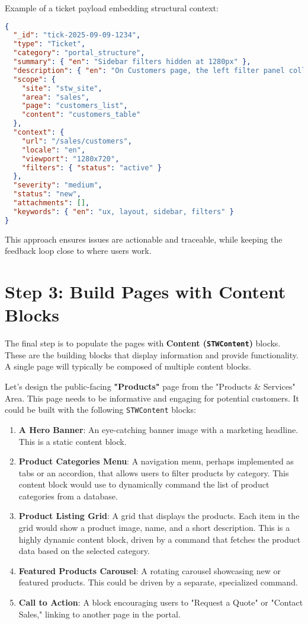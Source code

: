 Example of a ticket payload embedding structural context:
\begin{lstlisting}[language=JSON,caption={Ticket with Structural Context},label={lst:ticket-structure}]
{
  "_id": "tick-2025-09-09-1234",
  "type": "Ticket",
  "category": "portal_structure",
  "summary": { "en": "Sidebar filters hidden at 1280px" },
  "description": { "en": "On Customers page, the left filter panel collapses unexpectedly at 1280px width." },
  "scope": {
    "site": "stw_site",
    "area": "sales",
    "page": "customers_list",
    "content": "customers_table"
  },
  "context": {
    "url": "/sales/customers",
    "locale": "en",
    "viewport": "1280x720",
    "filters": { "status": "active" }
  },
  "severity": "medium",
  "status": "new",
  "attachments": [],
  "keywords": { "en": "ux, layout, sidebar, filters" }
}
\end{lstlisting}

This approach ensures issues are actionable and traceable, while keeping the feedback loop close to where users work.

\section{Step 3: Build Pages with Content Blocks}
\label{sec:build-with-content}

The final step is to populate the pages with \textbf{Content (\texttt{STWContent})} blocks. These are the building blocks that display information and provide functionality. A single page will typically be composed of multiple content blocks.

Let's design the public-facing \textbf{"Products"} page from the "Products \& Services" Area. This page needs to be informative and engaging for potential customers. It could be built with the following \texttt{STWContent} blocks:

\begin{enumerate}
    \item \textbf{A Hero Banner}: An eye-catching banner image with a marketing headline. This is a static content block.
    \item \textbf{Product Categories Menu}: A navigation menu, perhaps implemented as tabs or an accordion, that allows users to filter products by category. This content block would use \wbpl{} to dynamically command the list of product categories from a database.
    \item \textbf{Product Listing Grid}: A grid that displays the products. Each item in the grid would show a product image, name, and a short description. This is a highly dynamic content block, driven by a \wbpl{} command that fetches the product data based on the selected category.
    \item \textbf{Featured Products Carousel}: A rotating carousel showcasing new or featured products. This could be driven by a separate, specialized command.
    \item \textbf{Call to Action}: A block encouraging users to "Request a Quote" or "Contact Sales," linking to another page in the portal.
\end{enumerate}

